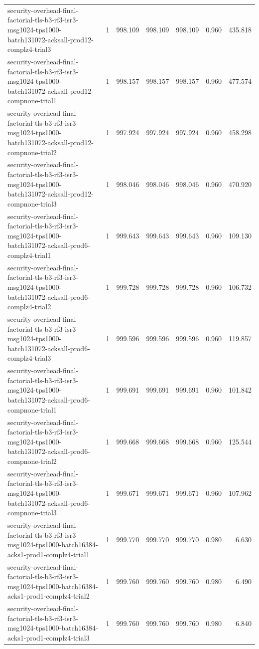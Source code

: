 \begin{tabular}{lrrrrrr}
security-overhead-final-factorial-tls-b3-rf3-isr3-msg1024-tps1000-batch131072-acksall-prod12-complz4-trial3 & 1 & 998.109 & 998.109 & 998.109 & 0.960 & 435.818 \\
security-overhead-final-factorial-tls-b3-rf3-isr3-msg1024-tps1000-batch131072-acksall-prod12-compnone-trial1 & 1 & 998.157 & 998.157 & 998.157 & 0.960 & 477.574 \\
security-overhead-final-factorial-tls-b3-rf3-isr3-msg1024-tps1000-batch131072-acksall-prod12-compnone-trial2 & 1 & 997.924 & 997.924 & 997.924 & 0.960 & 458.298 \\
security-overhead-final-factorial-tls-b3-rf3-isr3-msg1024-tps1000-batch131072-acksall-prod12-compnone-trial3 & 1 & 998.046 & 998.046 & 998.046 & 0.960 & 470.920 \\
security-overhead-final-factorial-tls-b3-rf3-isr3-msg1024-tps1000-batch131072-acksall-prod6-complz4-trial1 & 1 & 999.643 & 999.643 & 999.643 & 0.960 & 109.130 \\
security-overhead-final-factorial-tls-b3-rf3-isr3-msg1024-tps1000-batch131072-acksall-prod6-complz4-trial2 & 1 & 999.728 & 999.728 & 999.728 & 0.960 & 106.732 \\
security-overhead-final-factorial-tls-b3-rf3-isr3-msg1024-tps1000-batch131072-acksall-prod6-complz4-trial3 & 1 & 999.596 & 999.596 & 999.596 & 0.960 & 119.857 \\
security-overhead-final-factorial-tls-b3-rf3-isr3-msg1024-tps1000-batch131072-acksall-prod6-compnone-trial1 & 1 & 999.691 & 999.691 & 999.691 & 0.960 & 101.842 \\
security-overhead-final-factorial-tls-b3-rf3-isr3-msg1024-tps1000-batch131072-acksall-prod6-compnone-trial2 & 1 & 999.668 & 999.668 & 999.668 & 0.960 & 125.544 \\
security-overhead-final-factorial-tls-b3-rf3-isr3-msg1024-tps1000-batch131072-acksall-prod6-compnone-trial3 & 1 & 999.671 & 999.671 & 999.671 & 0.960 & 107.962 \\
security-overhead-final-factorial-tls-b3-rf3-isr3-msg1024-tps1000-batch16384-acks1-prod1-complz4-trial1 & 1 & 999.770 & 999.770 & 999.770 & 0.980 & 6.630 \\
security-overhead-final-factorial-tls-b3-rf3-isr3-msg1024-tps1000-batch16384-acks1-prod1-complz4-trial2 & 1 & 999.760 & 999.760 & 999.760 & 0.980 & 6.490 \\
security-overhead-final-factorial-tls-b3-rf3-isr3-msg1024-tps1000-batch16384-acks1-prod1-complz4-trial3 & 1 & 999.760 & 999.760 & 999.760 & 0.980 & 6.840 \\

\end{tabular}
